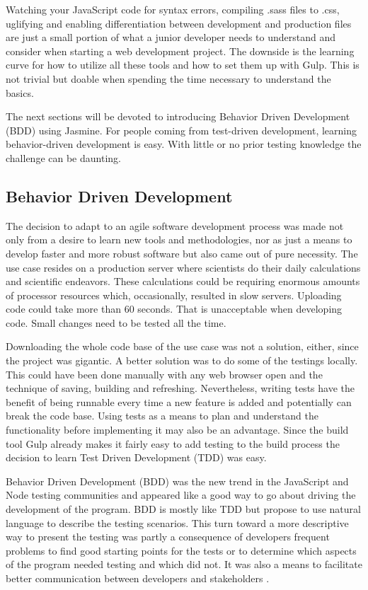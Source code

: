 \documentclass[english]{ifimaster}
\begin{document}
Watching your JavaScript code for syntax errors, compiling .sass files to .css, uglifying and enabling differentiation between development and production files are just a small portion of what a junior developer needs to understand and consider when starting a web development project. The downside is the learning curve for how to utilize all these tools and how to set them up with Gulp. This is not trivial but doable when spending the time necessary to understand the basics.

The next sections will be devoted to introducing Behavior Driven Development (BDD) using Jasmine. For people coming from test-driven development, learning behavior-driven development is easy. With little or no prior testing knowledge the challenge can be daunting.

\subsection{Behavior Driven Development}
The decision to adapt to an agile software development process was made not only from a desire to learn new tools and methodologies, nor as just a means to develop faster and more robust software but also came out of pure necessity. The use case resides on a production server where scientists do their daily calculations and scientific endeavors. These calculations could be requiring enormous amounts of processor resources which, occasionally, resulted in slow servers. Uploading code could take more than 60 seconds. That is unacceptable when developing code. Small changes need to be tested all the time.

Downloading the whole code base of the use case was not a solution, either, since the project was gigantic. A better solution was to do some of the testings locally. This could have been done manually with any web browser open and the technique of saving, building and refreshing. Nevertheless, writing tests have the benefit of being runnable every time a new feature is added and potentially can break the code base. Using tests as a means to plan and understand the functionality before implementing it may also be an advantage. Since the build tool Gulp already makes it fairly easy to add testing to the build process the decision to learn Test Driven Development (TDD) was easy. 

Behavior Driven Development (BDD) was the new trend in the JavaScript and Node testing communities and appeared like a good way to go about driving the development of the program. BDD is mostly like TDD but propose to use natural language to describe the testing scenarios. This turn toward a more descriptive way to present the testing was partly a consequence of developers frequent problems to find good starting points for the tests or to determine which aspects of the program needed testing and which did not. It was also a means to facilitate better communication between developers and stakeholders \parencite{soeken2012}. 
\end{document}
